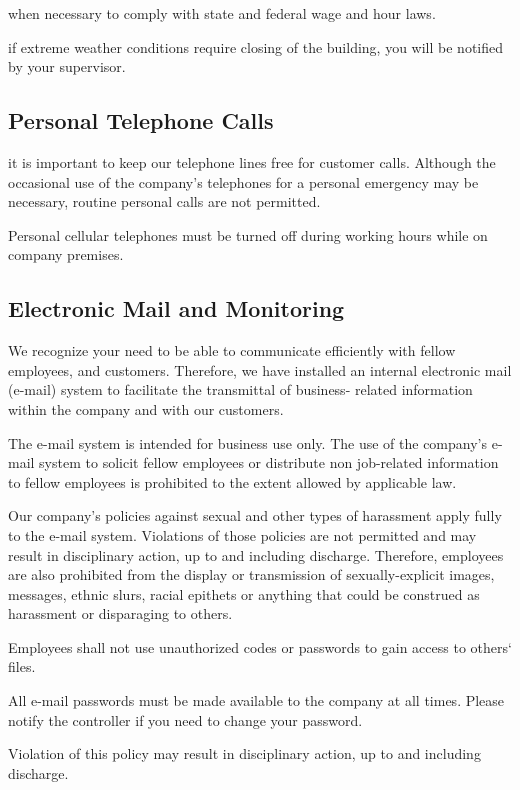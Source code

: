 when necessary to comply with state and federal wage and hour laws.

if extreme weather conditions require closing of the building, you will be notified by your supervisor.

\subsection{Personal Telephone Calls}

it is important to keep our telephone lines free for customer calls. Although the occasional use of the company's telephones for a personal emergency may be necessary, routine personal calls are not permitted.

Personal cellular telephones must be turned off during working hours while on company premises.

\subsection{Electronic Mail and Monitoring}

We recognize your need to be able to communicate efficiently with fellow employees, and customers. Therefore, we have installed an internal electronic mail (e-mail) system to facilitate the transmittal of business- related information within the company and with our customers.

The e-mail system is intended for business use only. The use of the company's e-mail system to solicit fellow employees or distribute non job-related information to fellow employees is prohibited to the extent allowed by applicable law.

Our company's policies against sexual and other types of harassment apply fully to the e-mail system. Violations of those policies are not permitted and may result in disciplinary action, up to and including discharge. Therefore, employees are also prohibited from the display or transmission of sexually-explicit images, messages, ethnic slurs, racial epithets or anything that could be construed as harassment or disparaging to others.

Employees shall not use unauthorized codes or passwords to gain access to others‘ files.

All e-mail passwords must be made available to the company at all times. Please notify the controller if you need to change your password.

Violation of this policy may result in disciplinary action, up to and including discharge.

